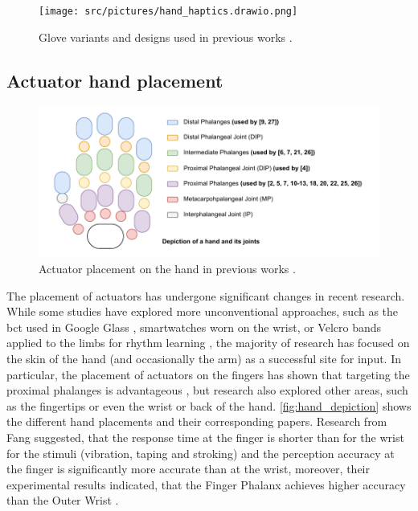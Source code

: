 \begin{figure}[!ht]
    \centering

    \texttt{[image: src/pictures/hand\_haptics.drawio.png]}
    \caption{Glove variants and designs used in previous works \cite{Donchev2021,Fang2023,Fang2023a,Huang2008,Huang2010,Learning2024,Luzhnica2016,Markow2010,Seim2014a,Seim2017,Seim2015b,Seim2014,Vaio6810}.}
    \label{fig:glove_designs}

\end{figure}



\subsection*{Actuator hand placement}
 \begin{figure}[!ht]
    \centering
    \includegraphics[width=\linewidth]{src/pictures/hand_Depiction.drawio.pdf}
    \caption{Actuator placement on the hand in previous works \cite{Learning2024,Fang2023,Fang2023a,Fang2022,Fang2022a,Donchev2021,Hsu2021,Yang2017,Seim2017,Seim2015b,Seim2014a,Seim2014, Huang2010, Vaio6810, Kohlsdorf2010, Markow2010, Huang2008}.}
    \label{fig:hand_depiction}
\end{figure}
The placement of actuators has undergone significant changes in recent research. While some studies have explored more unconventional approaches, such as the \gls{bct} used in Google Glass \cite{Seim2016a}, smartwatches \cite{Seim2018} worn on the wrist, or Velcro bands applied to the limbs for rhythm learning \cite{Bouwer2011, Holland2010}, the majority of research has focused on the skin of the hand (and occasionally the arm) as a successful site for input.
In particular, the placement of actuators on the fingers has shown that targeting the proximal phalanges is advantageous \cite{Fang2022a}, but research also explored other areas, such as the fingertips \cite{Yang2017} or even the wrist or back of the hand. \autoref{fig:hand_depiction} shows the different hand placements and their corresponding papers.
Research from Fang suggested, that the response time at the finger is shorter than for the wrist for the stimuli (vibration, taping and stroking) and the perception accuracy at the finger is significantly more accurate than at the wrist, moreover, their experimental results indicated, that the Finger Phalanx achieves higher accuracy than the Outer Wrist \cite{Fang2022a}.

